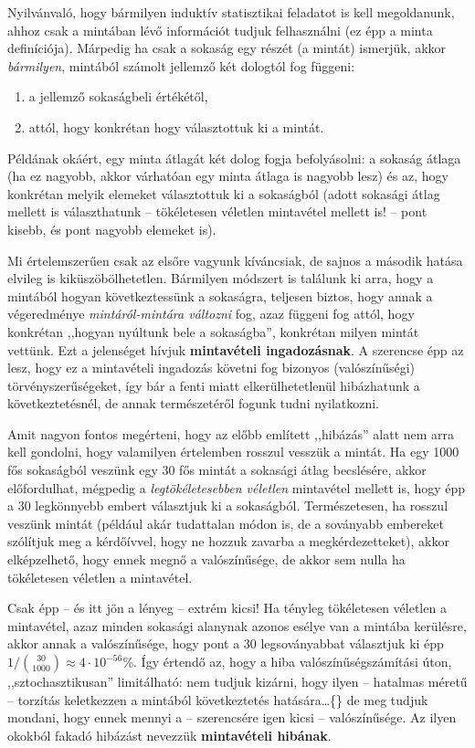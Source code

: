 \documentclass[]{book}
\providecommand{\tightlist}{%
  \setlength{\itemsep}{0pt}\setlength{\parskip}{0pt}}
\begin{document}
Nyilvánvaló, hogy bármilyen induktív statisztikai feladatot is kell megoldanunk, ahhoz csak a mintában lévő információt tudjuk felhasználni (ez épp a minta definíciója). Márpedig ha csak a sokaság egy részét (a mintát) ismerjük, akkor \emph{bármilyen}, mintából számolt jellemző két dologtól fog függeni:

\begin{enumerate}
\def\labelenumi{\arabic{enumi}.}
\tightlist
\item
  a jellemző sokaságbeli értékétől,
\item
  attól, hogy konkrétan hogy választottuk ki a mintát.
\end{enumerate}

Példának okáért, egy minta átlagát két dolog fogja befolyásolni: a sokaság átlaga (ha ez nagyobb, akkor várhatóan egy minta átlaga is nagyobb lesz) és az, hogy konkrétan melyik elemeket választottuk ki a sokaságból (adott sokasági átlag mellett is választhatunk -- tökéletesen véletlen mintavétel mellett is! -- pont kisebb, és pont nagyobb elemeket is).

Mi értelemszerűen csak az elsőre vagyunk kíváncsiak, de sajnos a második hatása elvileg is kiküszöbölhetetlen. Bármilyen módszert is találunk ki arra, hogy a mintából hogyan következtessünk a sokaságra, teljesen biztos, hogy annak a végeredménye \emph{mintáról-mintára változni} fog, azaz függeni fog attól, hogy konkrétan ,,hogyan nyúltunk bele a sokaságba'', konkrétan milyen mintát vettünk. Ezt a jelenséget hívjuk \textbf{mintavételi ingadozásnak}. A szerencse épp az lesz, hogy ez a mintavételi ingadozás követni fog bizonyos (valószínűségi) törvényszerűségeket, így bár a fenti miatt elkerülhetetlenül hibázhatunk a következtetésnél, de annak természetéről fogunk tudni nyilatkozni.

Amit nagyon fontos megérteni, hogy az előbb említett ,,hibázás'' alatt nem arra kell gondolni, hogy valamilyen értelemben rosszul vesszük a mintát. Ha egy 1000 fős sokaságból veszünk egy 30 fős mintát a sokasági átlag becslésére, akkor előfordulhat, mégpedig a \emph{legtökéletesebben véletlen} mintavétel mellett is, hogy épp a 30 legkönnyebb embert választjuk ki a sokaságból. Természetesen, ha rosszul veszünk mintát (például akár tudattalan módon is, de a soványabb embereket szólítjuk meg a kérdőívvel, hogy ne hozzuk zavarba a megkérdezetteket), akkor elképzelhető, hogy ennek megnő a valószínűsége, de akkor sem nulla ha tökéletesen véletlen a mintavétel.

Csak épp -- és itt jön a lényeg -- extrém kicsi! Ha tényleg tökéletesen véletlen a mintavétel, azaz minden sokasági alanynak azonos esélye van a mintába kerülésre, akkor annak a valószínűsége, hogy pont a 30 legsoványabbat választjuk ki épp \(1/\binom{30}{1000}\approx 4\cdot 10^{-56}\)\%. Így értendő az, hogy a hiba valószínűségszámítási úton, ,,sztochasztikusan'' limitálható: nem tudjuk kizárni, hogy ilyen -- hatalmas méretű -- torzítás keletkezzen a mintából következtetés hatására\dots\{\} de meg tudjuk mondani, hogy ennek mennyi a -- szerencsére igen kicsi -- valószínűsége. Az ilyen okokból fakadó hibázást nevezzük \textbf{mintavételi hibának}.
\end{document}
